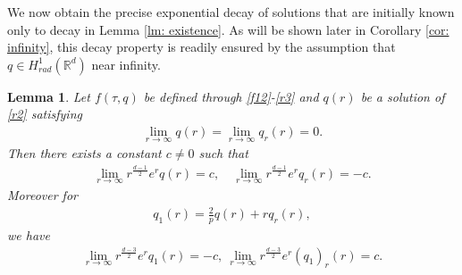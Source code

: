 \documentclass[12pt]{amsart}
\newcommand{\R}{\mathbb R}
\newtheorem{lemma}[theorem]{Lemma}
\begin{document}
We now obtain the precise exponential decay of solutions that are initially known only to decay in Lemma \ref{lm: existence}. As will be shown later in Corollary \ref{cor: infinity}, this decay property is readily ensured by the assumption that $q\in H^1_{rad}(\R^d)$ near infinity.  

\begin{lemma}\label{lm: infinity}
Let $f(\tau, q)$ be defined through \eqref{f12}-\eqref{r3} and $q(r)$ be a solution of \eqref{r2} satisfying
\begin{align*}
\lim_{r\to \infty}q(r)=\lim_{r\to \infty}q_r(r)=0. 
\end{align*}
Then there exists a constant $c\neq 0$ such that 
\begin{align}\label{18}
\lim_{r\to \infty}  r^{\frac{d-1}2}e^{r}q(r)=c, \quad \lim_{r\to \infty}  r^{\frac{d-1}2}e^{r}q_r(r)=-c.
\end{align}
Moreover for
\begin{align}\label{19}
q_1(r)=\tfrac 2p q(r)+rq_r(r),
\end{align}
we have  
\begin{align}\label{20}
\lim_{r\to \infty}  r^{\frac{d-3}2}e^{r} q_1(r)=-c, \ \lim_{r\to \infty}  r^{\frac{d-3}2}e^{r} (q_1)_r(r)=c. 
\end{align}
\end{lemma}
\end{document}
